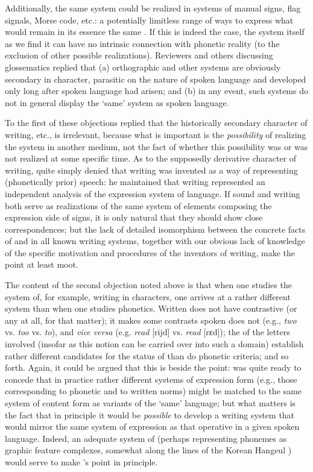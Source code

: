 Additionally, the same system could be realized in systems of manual
signs, flag signals, Morse code, etc.: a potentially limitless range
of ways to express what would remain in its essence the same
. If this is indeed the case, the system itself as we
find it can have no intrinsic connection with phonetic reality (to the
exclusion of other possible realizations). Reviewers and others
discussing glossematics replied that (a) orthographic and other
systems are obviously secondary in character, parasitic on the nature
of spoken language and developed only long after spoken language had
arisen; and (b) in any event, such systems do not in general display
the `same' system as spoken language.

To the first of these objections {\Hjelmslev} replied that the
historically second\-ary character of writing, etc., is irrelevant,
because what is important is the \emph{possibility} of realizing the
system in another medium, not the fact of whether this possibility was
or was not realized at some specific time. As to the supposedly
derivative character of writing, {\Hjelmslev} quite simply denied that
writing was invented as a way of representing (phonetically prior)
speech: he maintained that writing represented an independent analysis
of the expression system of language. If sound and writing both serve
as realizations of the same system of elements composing the
expression side of signs, it is only natural that they should show
close correspondences; but the lack of detailed isomorphism between
the concrete facts of  and  in all known writing
systems, together with our obvious lack of knowledge of the specific
motivation and procedures of the inventors of writing, make the point
at least moot.

The content of the second objection noted above is that when one
studies the system of, for example,  writing in 
characters, one arrives at a rather different system than when one
studies  phonetics. Written  does not have contrastive
 (or any  at all, for that matter); it makes some
contrasts spoken  does not (e.g., \emph{two} vs. \emph{too}
vs. \emph{to}), and \emph{vice versa} (e.g. \emph{read} [rijd]
vs. \emph{read} [rɛd]); the  of the letters
involved (insofar as this notion can be carried over into such a
domain) establish rather different candidates for the status of
 than do phonetic criteria; and so forth. Again, it could
be argued that this is beside the point: {\Hjelmslev} was quite ready to
concede that in practice rather different systems of expression form
(e.g., those corresponding to phonetic and to written norms) might be
matched to the same system of content form as variants of the `same'
language; but what matters is the fact that in principle it would be
\emph{possible} to develop a writing system that would mirror the same
system of expression as that operative in a given spoken
language. Indeed, an adequate system of 
(perhaps representing phonemes as graphic feature complexes, somewhat
along the lines of the Korean Hangeul ) would serve to make
{\Hjelmslev}'s point in principle.

